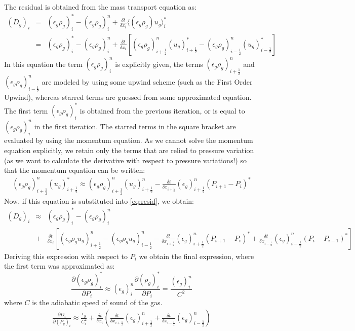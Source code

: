The residual is obtained from the mass transport equation as:
\begin{eqnarray}
\label{eq:resid}
(D_g)_i & = &  (\epsilon_g \rho_g)_i^{*} - (\epsilon_g \rho_g)_i^{n}
+ \frac {\delta t} {\delta x_i } \langle (\epsilon_g \rho_g) u_g \rangle_i^{*} \\ \nonumber
& = & (\epsilon_g \rho_g)_i^{*} - (\epsilon_g \rho_g)_i^{n}
+ \frac {\delta t} {\delta x_i } 
\left[ 
(\epsilon_g \rho_g)^n_{i+\frac{1}{2}}(u_g)^*_{i+\frac{1}{2}} -
(\epsilon_g \rho_g)^n_{i-\frac{1}{2}}(u_g)^*_{i-\frac{1}{2}}
\right]
\end{eqnarray}
In this equation the term $(\epsilon_g \rho_g)_i^{n}$ is explicitly given,
the terms $(\epsilon_g \rho_g)^n_{i+\frac{1}{2}}$ and $(\epsilon_g \rho_g)^n_{i-\frac{1}{2}}$ are
modeled by using some upwind scheme (such as the First Order Upwind), whereas starred terms
are guessed from some approximated equation. The first term $(\epsilon_g \rho_g)_i^{*}$ is
obtained from the previous iteration, or is equal to $(\epsilon_g \rho_g)_i^{n}$ in the
first iteration. The starred terms in the square bracket are evaluated by using the momentum
equation. As we cannot solve the momentum equation explicitly, we retain only the terms
that are relied to pressure variation (as we want to calculate the derivative with respect
to pressure variations!) so that the momentum equation can be written:
\begin{eqnarray}
(\epsilon_g \rho_g)^n_{i+\frac{1}{2}}(u_g)^*_{i+\frac{1}{2}} \approx
(\epsilon_g \rho_g)^n_{i+\frac{1}{2}}(u_g)^n_{i+\frac{1}{2}} -
\frac {\delta t} {\delta x_{i+\frac{1}{2}}}
(\epsilon_g)^n_{i+\frac{1}{2}}(P_{i+1}-P_i)^*
\nonumber
\end{eqnarray}
Now, if this equation is substituted into \ref{eq:resid}, we obtain:
\begin{eqnarray}
(D_g)_i & \approx &  (\epsilon_g \rho_g)_i^{*} - (\epsilon_g \rho_g)_i^{n} \\
& + & \frac{\delta t}{\delta x_i } 
\left[ 
(\epsilon_g \rho_g u_g)^n_{i+\frac{1}{2}} - (\epsilon_g \rho_g u_g)^n_{i-\frac{1}{2}} 
- \frac{\delta t}{\delta x_{i+\frac{1}{2}}} (\epsilon_g)^n_{i+\frac{1}{2}}(P_{i+1}-P_i)^*
+ \frac{\delta t}{\delta x_{i-\frac{1}{2}}} (\epsilon_g)^n_{i-\frac{1}{2}}(P_i-P_{i-1})^*
\right]
\nonumber
\end{eqnarray}
Deriving this expression with respect to $P_i$ we obtain the final expression, where
the first term was approximated as:
\begin{displaymath}
\frac{\partial (\epsilon_g \rho_g)_i^{*} } {\partial P_i } \approx 
(\epsilon_g)_i^n \frac{\partial (\rho_g)_i^{*} } {\partial P_i } = 
\frac{(\epsilon_g)_i^n}{C^2}
\end{displaymath}
where $C$ is the adiabatic speed of sound of the gas.\\
\begin{eqnarray}
\frac{\partial D_{i}} {\partial (P_g)_{i}} \approx
\frac{\epsilon_g}{C_{i}^{2}} +
\frac {\delta t} {\delta x_i} \left(
\frac{\delta t}{\delta x_{i+\frac{1}{2}}}(\epsilon_g)^n_{i+\frac{1}{2}} + 
\frac{\delta t}{\delta x_{i-\frac{1}{2}}}(\epsilon_g)^n_{i-\frac{1}{2}} \right)
\nonumber
\end{eqnarray}
%
